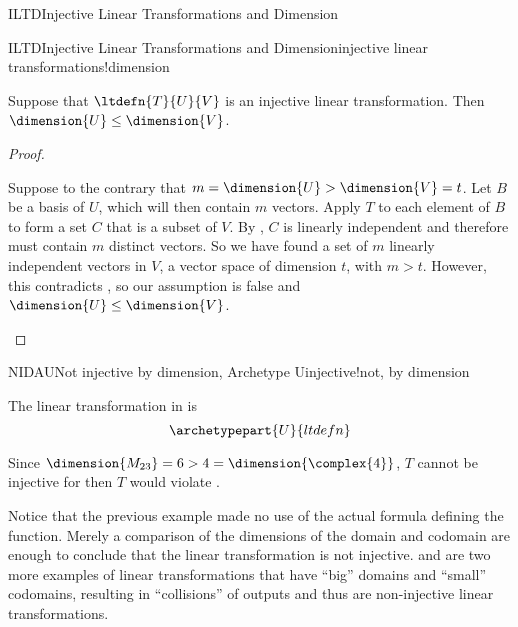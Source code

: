 \begin{subsect}{ILTD}{Injective Linear Transformations and Dimension}
%
\begin{theorem}{ILTD}{Injective Linear Transformations and Dimension}{injective linear transformations!dimension}
\begin{para}Suppose that $\ltdefn{T}{U}{V}$ is an injective linear transformation.  Then $\dimension{U}\leq\dimension{V}$.\end{para}
\end{theorem}
%
\begin{proof}
%
\begin{para}Suppose to the contrary that $m=\dimension{U}>\dimension{V}=t$.  Let $B$ be  a basis of $U$, which will then contain $m$ vectors.  Apply $T$ to each element of $B$ to form a set $C$ that is a subset of $V$.  By , $C$ is linearly independent and therefore must contain $m$ distinct vectors.  So we have found a set of $m$ linearly independent vectors in $V$, a vector space of dimension $t$, with $m>t$.  However, this contradicts , so our assumption is false and $\dimension{U}\leq\dimension{V}$.\end{para}
%
\end{proof}
%
\begin{example}{NIDAU}{Not injective by dimension, Archetype U}{injective!not, by dimension}
\begin{para}The linear transformation in  is
%
\begin{equation*}
\archetypepart{U}{ltdefn}\end{equation*}
\end{para}
%
\begin{para}Since $\dimension{M_{23}}=6>4=\dimension{\complex{4}}$, $T$ cannot be injective for then $T$ would violate .\end{para}
%
\end{example}
%
\begin{para}Notice that the previous example made no use of the actual formula defining the function.  Merely a comparison of the dimensions of the domain and codomain are enough to conclude that the linear transformation is not injective.   and  are two more examples of linear transformations that have ``big'' domains and ``small'' codomains, resulting in ``collisions'' of outputs and thus are non-injective linear transformations.\end{para}
%
\end{subsect}
